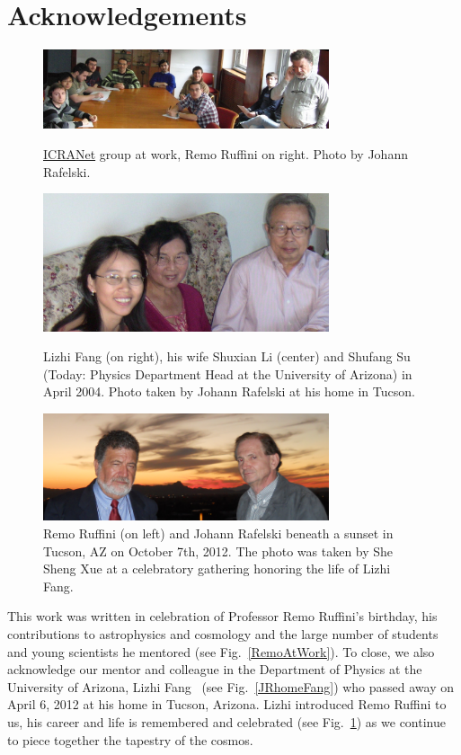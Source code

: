 \documentclass[universe,article,submit,moreauthors,pdftex,a4paper]{Definitions/mdpi}
\newcommand*{\rf}[1]{Fig.~{\ref{#1}}}
\newcommand*{\xblue}{\color{black}}
\begin{document}
{\xblue 
\section*{Acknowledgements}

\begin{figure}[ht]
    \centering
    \includegraphics[width=0.75\textwidth]{./plots/12MarchRemoAtWorkC.jpg}
    \caption{\noindent\href{https://www.icranet.org/}{ICRANet} group at work, Remo Ruffini on right. Photo by Johann Rafelski.\label{RemoAtWork}}
    \vspace{\floatsep}
    \includegraphics[width=0.75\textwidth]{./plots/04April14ShuFangC.JPG}
    \caption{Lizhi Fang (on right), his wife Shuxian Li (center) and Shufang Su (Today: Physics Department Head at the University of Arizona) in April 2004. Photo taken by Johann Rafelski at his home in Tucson.\label{JRhomeFang}}
    \vspace{\floatsep}
    \includegraphics[width=0.75\textwidth]{./plots/remo_sunset_new.PNG}
    \caption{Remo Ruffini (on left) and Johann Rafelski beneath a sunset in Tucson, AZ on October 7th, 2012. The photo was taken by She Sheng Xue at a celebratory gathering honoring the life of Lizhi Fang.\label{remo_sunset}}
\end{figure}

This work was written in celebration of Professor Remo Ruffini's birthday, his contributions to astrophysics and cosmology and the large number of students and young scientists he mentored (see \rf{RemoAtWork}). To close, we also acknowledge our mentor and colleague in the Department of Physics at the University of Arizona, Lizhi Fang~\cite{fang1984cosmology,fang1985galaxies,fang1987quantum} (see \rf{JRhomeFang}) who passed away on April 6, 2012 at his home in Tucson, Arizona. Lizhi introduced Remo Ruffini to us, his career and life is remembered and celebrated (see \rf{remo_sunset}) as we continue to piece together the tapestry of the cosmos.
}
\vfill\eject

\end{document}
